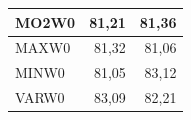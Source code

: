 \begin{table}
\begin{tabular}{@{}lrr@{}}
MO2W0 & 81,21 &  81,36  \\ \hline %
MAXW0 & 81,32 & 81,06 \\ \hline %
MINW0 & 81,05 & 83,12 \\ \hline %
VARW0 & 83,09 &  82,21  \\ \hline 
\end{tabular}
\label{exper_ordenaciones}
\end{table}
